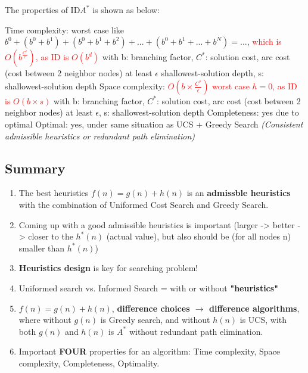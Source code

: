 The properties of ID$A^{*}$ is shown as below:
\begin{outline}
    \1 Time complexity: worst case like $b^{0} + (b^{0} + b^{1}) + (b^{0} + b^{1} + b^{2}) + ... + (b^{0} + b^{1} + ... + b^{N}) = ...$, \textcolor{red}{which is $O(b^{\frac{C^{*}}{\epsilon}})$, as ID is $O(b^{d})$}
        \2 with b: branching factor, $C^{*}$: solution cost, arc cost (cost between 2 neighbor nodes) at least $\epsilon$ shallowest-solution depth, s: shallowest-solution depth
    \1 Space complexity: \textcolor{red}{$O(b \times \frac{C^{*}}{\epsilon})$ worst case $h=0$, as ID is $O(b \times s)$}
        \2 with b: branching factor, $C^{*}$: solution cost, arc cost (cost between 2 neighbor nodes) at least $\epsilon$, s: shallowest-solution depth
    \1 Completeness: yes due to optimal
    \1 Optimal: yes, under same situation as UCS + Greedy Search \emph{(Consistent admissible heuristics or redundant path elimination)}
\end{outline}


\subsection{Summary}
\begin{enumerate}
    \item The best heuristics $f(n) = g(n) + h(n)$ is an \textbf{admissble heuristics} with the combination of Uniformed Cost Search and Greedy Search.
    \item Coming up with a good admissible heuristics is important (larger -> better -> closer to the $h^{*}(n)$ (actual value), but also should be (for all nodes n) smaller than $h^{*}(n)$)
    \item \textbf{Heuristics design} is key for searching problem!
    \item Uniformed search vs. Informed Search = with or without \textbf{"heuristics"}
    \item $f(n) = g(n) + h(n)$, \textbf{difference choices $\rightarrow$ difference algorithms}, where without $g(n)$ is Greedy search, and without $h(n)$ is UCS, with both $g(n)$ and $h(n)$ is $A^{*}$ without redundant path elimination.
    \item Important \textbf{FOUR} properties for an algorithm: Time complexity, Space complexity, Completeness, Optimality.
\end{enumerate}

\pagebreak